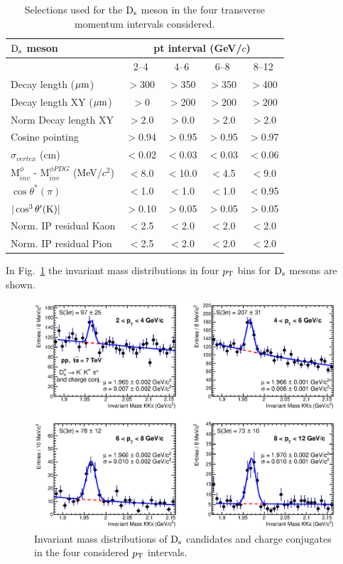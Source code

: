 \begin{table}[tbh!]
\centering
\begin{tabular}{|l|c|c|c|c|} 
\hline 
 ${\rm D_s}$ meson& \multicolumn{4}{c|}{pt interval (GeV/$c$)}\\
\hline
 & 2--4  & 4--6 & 6--8 & 8--12\\
\hline
Decay length ($\mathrm{\mu m}$)        & $>$300 & $>$350 & $>$350 & $>$400\\
Decay length XY ($\mathrm{\mu m}$)     & $>$0 & $>$200 & $>$200 & $>$200\\
Norm Decay length XY          & $>$2.0& $>$0.0 & $>$2.0 & $>$2.0\\
Cosine pointing              & $>$0.94 & $>$0.95 & $>$0.95 & $>$0.97\\
$\sigma_{vertex}$  (cm)          & $<$0.02 & $<$0.03 & $<$0.03 & $<$0.06\\
M$^{\phi}_{inv}$ - M$^{\phi PDG}_{inv}$ (MeV/$c^{2}$) & $<$8.0 & $<$10.0 & $<$4.5 & $<$9.0\\
$\cos \theta^*(\pi)$    & $<$1.0 & $<$1.0 & $<$1.0 & $<$0.95\\
$|\cos^3 \theta^\prime({\rm K})|$        & $>$0.10 & $>$0.05 & $>$0.05 & $>$0.05\\
Norm. IP residual Kaon  & $<$2.5 & $<$2.0 & $<$2.0 & $<$2.0 \\
Norm. IP residual Pion  & $<$2.5 & $<$2.0 & $<$2.0 & $<$2.0 \\[1ex]
\hline
\end{tabular}
\caption{Selections used for the ${\rm D_s}$ meson in the four transverse momentum intervals considered.} 
\label{tab:cutsDs}
\end{table}
In Fig.~\ref{fig:invmassDs} the invariant mass distributions 
in four $p_{\rm T}$ bins for ${\rm D_s}$ mesons are shown.
\begin{figure}[!htb]
\begin{center}
 \includegraphics[width=.99\textwidth]{FigCap4/DsMassHistos_ppPass4.eps}
\caption{Invariant mass distributions of ${\rm D_s}$ candidates and charge
conjugates in the four considered $p_{\rm T}$ intervals.}             
\label{fig:invmassDs}
\end{center}
\end{figure}
